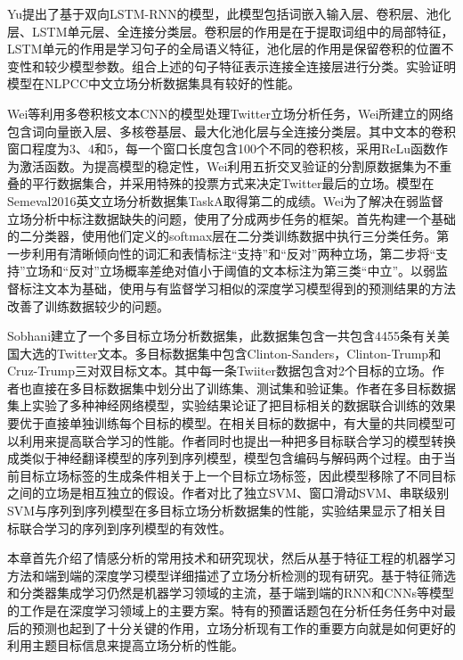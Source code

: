 Yu提出了基于双向LSTM-RNN的模型，此模型包括词嵌入输入层、卷积层、池化层、LSTM单元层、全连接分类层。卷积层的作用是在于提取词组中的局部特征，LSTM单元的作用是学习句子的全局语义特征，池化层的作用是保留卷积的位置不变性和较少模型参数。组合上述的句子特征表示连接全连接层进行分类。实验证明模型在NLPCC中文立场分析数据集具有较好的性能。

Wei等利用多卷积核文本CNN的模型处理Twitter立场分析任务，Wei所建立的网络包含词向量嵌入层、多核卷基层、最大化池化层与全连接分类层。其中文本的卷积窗口程度为3、4和5，每一个窗口长度包含100个不同的卷积核，采用ReLu函数作为激活函数。为提高模型的稳定性，Wei利用五折交叉验证的分割原数据集为不重叠的平行数据集合，并采用特殊的投票方式来决定Twitter最后的立场。模型在Semeval2016英文立场分析数据集TaskA取得第二的成绩。Wei为了解决在弱监督立场分析中标注数据缺失的问题，使用了分成两步任务的框架。首先构建一个基础的二分类器，使用他们定义的softmax层在二分类训练数据中执行三分类任务。第一步利用有清晰倾向性的词汇和表情标注“支持”和“反对”两种立场，第二步将“支持”立场和“反对”立场概率差绝对值小于阈值的文本标注为第三类“中立”。以弱监督标注文本为基础，使用与有监督学习相似的深度学习模型得到的预测结果的方法改善了训练数据较少的问题。

Sobhani建立了一个多目标立场分析数据集，此数据集包含一共包含4455条有关美国大选的Twitter文本。多目标数据集中包含Clinton-Sanders，Clinton-Trump和Cruz-Trump三对双目标文本。其中每一条Twiiter数据包含对2个目标的立场。作者也直接在多目标数据集中划分出了训练集、测试集和验证集。作者在多目标数据集上实验了多种神经网络模型，实验结果论证了把目标相关的数据联合训练的效果要优于直接单独训练每个目标的模型。在相关目标的数据中，有大量的共同模型可以利用来提高联合学习的性能。作者同时也提出一种把多目标联合学习的模型转换成类似于神经翻译模型的序列到序列模型，模型包含编码与解码两个过程。由于当前目标立场标签的生成条件相关于上一个目标立场标签，因此模型移除了不同目标之间的立场是相互独立的假设。作者对比了独立SVM、窗口滑动SVM、串联级别SVM与序列到序列模型在多目标立场分析数据集的性能，实验结果显示了相关目标联合学习的序列到序列模型的有效性。






本章首先介绍了情感分析的常用技术和研究现状，然后从基于特征工程的机器学习方法和端到端的深度学习模型详细描述了立场分析检测的现有研究。基于特征筛选和分类器集成学习仍然是机器学习领域的主流，基于端到端的RNN和CNNs等模型的工作是在深度学习领域上的主要方案。特有的预置话题包在分析任务任务中对最后的预测也起到了十分关键的作用，立场分析现有工作的重要方向就是如何更好的利用主题目标信息来提高立场分析的性能。
